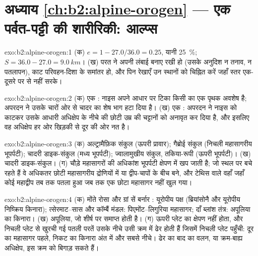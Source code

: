 \section*{अध्याय \ref{ch:b2:alpine-orogen} --- एक पर्वत-पट्टी की शारीरिकी: आल्प्स}

\begin{solution}{exo:b2:alpine-orogen:1}
(क) $e = 1 - 27.0/36.0 = 0.25$, यानी \qty{25}{\percent}; $S = 36.0 - 27.0 =
\qty{9.0}{km}$। (ख) परत ने अपनी लंबाई बनाए रखी हो (उसके अनुदिश न तनाव, न पतलापन),
काट परिवहन-दिशा के समांतर हो, और पिन रेखाएँ उन स्थानों को चिह्नित करें
जहाँ स्तर एक-दूसरे पर से नहीं सरके।
\end{solution}

\begin{solution}{exo:b2:alpine-orogen:2}
(क) एक : नाइस अपने  आधार पर टिका किसी  का एक पृथक अवशेष है;
अपरदन ने उसके चारों ओर से चादर का शेष भाग हटा दिया है। (ख) एक : अपरदन ने
नाइस  को काटकर उसके आधारी अधिक्षेप के नीचे की छोटी उम्र की चट्टानों को अनावृत कर दिया है, और इसलिए वह अधिक्षेप
हर ओर खिड़की से दूर की ओर नत है।
\end{solution}

\begin{solution}{exo:b2:alpine-orogen:3}
(क) अल्ट्रामैफ़िक संकुल (ऊपरी प्रावार); गैब्रोई संकुल (निचली महासागरीय भूपर्पटी);
चादरी डाइक-संकुल (मध्य भूपर्पटी); ज्वालामुखीय संकुल, तकिया-रूपी (ऊपरी भूपर्पटी)।
(ख) चादरी डाइक-संकुल। (ग) चौड़े महासागरों की अधिकांश भूपर्पटी क्षेपण में खप जाती है;
जो  स्थल पर बचे रहते हैं वे अधिकतर छोटी महासागरीय द्रोणियों में या द्वीप-चापों के
बीच बने, और टेथिस वाले वहाँ जहाँ कोई महाद्वीप तब तक पतला हुआ जब तक एक छोटा महासागर नहीं खुल गया।
\end{solution}

\begin{solution}{exo:b2:alpine-orogen:4}
(क) मोंते रोसा और ग्रां सें बर्नार : यूरोपीय पक्ष (ब्रियांसोनै और
यूरोपीय निष्क्रिय किनारा); त्सेरमाट--सास और कॉम्बैं मंडल: पिएमोंट--लिगुरिया महासागर; दाँ
ब्लांश तंत्र: अपूलिया का किनारा। (ख) अपूलिया, जो शीर्ष पर समाप्त होती है। (ग) ऊपरी प्लेट का
क्षेपण नहीं होता, और निचली प्लेट से खुरची गई पतली परतें उसके नीचे उसी क्रम में ढेर होती हैं जिसमें
निचली प्लेट पहुँची: दूर का महासागर पहले, निकट का किनारा अंत में और सबसे नीचे। ढेर का बाद का वलन,
या क्रम-बाह्य अधिक्षेप, इस क्रम को बिगाड़ सकते हैं।
\end{solution}

